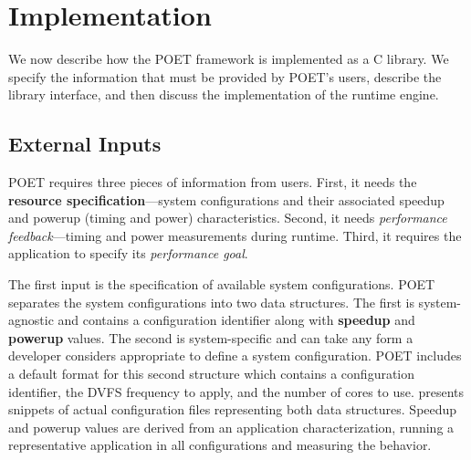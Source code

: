 \section{Implementation}
\label{sec:poet-implementation}

We now describe how the POET framework is implemented as a C library.
We specify the information that must be provided by POET's users, describe the library interface, and then discuss the implementation of the runtime engine.

\subsection{External Inputs}

POET requires three pieces of information from users.
First, it needs the \textbf{resource specification}---system configurations and their associated speedup and powerup (timing and power) characteristics.
Second, it needs \emph{performance feedback}---timing and power measurements during runtime.
Third, it requires the application to specify its \emph{performance goal}.

The first input is the specification of available system configurations.
POET separates the system configurations into two data structures.
The first is system-agnostic and contains a configuration identifier along with \textbf{speedup} and \textbf{powerup} values.
The second is system-specific and can take any form a developer considers appropriate to define a system configuration.
POET includes a default format for this second structure which contains a configuration identifier, the DVFS frequency to apply, and the number of cores to use.
 presents snippets of actual configuration files representing both data structures.
Speedup and powerup values are derived from an application characterization, \ie running a representative application in all configurations and measuring the behavior.

